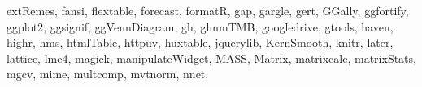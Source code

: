 \documentclass[
]{book}
\newenvironment{Shaded}{\begin{snugshade}}{\end{snugshade}}
\newcommand{\NormalTok}[1]{#1}
\newcommand{\StringTok}[1]{\textcolor[rgb]{0.31,0.60,0.02}{#1}}
\begin{document}
\begin{Shaded}
\begin{Highlighting}[]
  \StringTok{\textquotesingle{}extRemes\textquotesingle{}}\NormalTok{, }\StringTok{\textquotesingle{}fansi\textquotesingle{}}\NormalTok{, }\StringTok{\textquotesingle{}flextable\textquotesingle{}}\NormalTok{, }\StringTok{\textquotesingle{}forecast\textquotesingle{}}\NormalTok{, }\StringTok{\textquotesingle{}formatR\textquotesingle{}}\NormalTok{, }\StringTok{\textquotesingle{}gap\textquotesingle{}}\NormalTok{, }\StringTok{\textquotesingle{}gargle\textquotesingle{}}\NormalTok{, }\StringTok{\textquotesingle{}gert\textquotesingle{}}\NormalTok{, }\StringTok{\textquotesingle{}GGally\textquotesingle{}}\NormalTok{,}
  \StringTok{\textquotesingle{}ggfortify\textquotesingle{}}\NormalTok{, }\StringTok{\textquotesingle{}ggplot2\textquotesingle{}}\NormalTok{, }\StringTok{\textquotesingle{}ggsignif\textquotesingle{}}\NormalTok{, }\StringTok{\textquotesingle{}ggVennDiagram\textquotesingle{}}\NormalTok{, }\StringTok{\textquotesingle{}gh\textquotesingle{}}\NormalTok{, }\StringTok{\textquotesingle{}glmmTMB\textquotesingle{}}\NormalTok{, }\StringTok{\textquotesingle{}googledrive\textquotesingle{}}\NormalTok{,}
  \StringTok{\textquotesingle{}gtools\textquotesingle{}}\NormalTok{, }\StringTok{\textquotesingle{}haven\textquotesingle{}}\NormalTok{, }\StringTok{\textquotesingle{}highr\textquotesingle{}}\NormalTok{, }\StringTok{\textquotesingle{}hms\textquotesingle{}}\NormalTok{, }\StringTok{\textquotesingle{}htmlTable\textquotesingle{}}\NormalTok{, }\StringTok{\textquotesingle{}httpuv\textquotesingle{}}\NormalTok{, }\StringTok{\textquotesingle{}huxtable\textquotesingle{}}\NormalTok{, }\StringTok{\textquotesingle{}jquerylib\textquotesingle{}}\NormalTok{,}
  \StringTok{\textquotesingle{}KernSmooth\textquotesingle{}}\NormalTok{, }\StringTok{\textquotesingle{}knitr\textquotesingle{}}\NormalTok{, }\StringTok{\textquotesingle{}later\textquotesingle{}}\NormalTok{, }\StringTok{\textquotesingle{}lattice\textquotesingle{}}\NormalTok{, }\StringTok{\textquotesingle{}lme4\textquotesingle{}}\NormalTok{, }\StringTok{\textquotesingle{}magick\textquotesingle{}}\NormalTok{, }\StringTok{\textquotesingle{}manipulateWidget\textquotesingle{}}\NormalTok{, }\StringTok{\textquotesingle{}MASS\textquotesingle{}}\NormalTok{,}
  \StringTok{\textquotesingle{}Matrix\textquotesingle{}}\NormalTok{, }\StringTok{\textquotesingle{}matrixcalc\textquotesingle{}}\NormalTok{, }\StringTok{\textquotesingle{}matrixStats\textquotesingle{}}\NormalTok{, }\StringTok{\textquotesingle{}mgcv\textquotesingle{}}\NormalTok{, }\StringTok{\textquotesingle{}mime\textquotesingle{}}\NormalTok{, }\StringTok{\textquotesingle{}multcomp\textquotesingle{}}\NormalTok{, }\StringTok{\textquotesingle{}mvtnorm\textquotesingle{}}\NormalTok{, }\StringTok{\textquotesingle{}nnet\textquotesingle{}}\NormalTok{,}

\end{Highlighting}
\end{Shaded}
\end{document}
